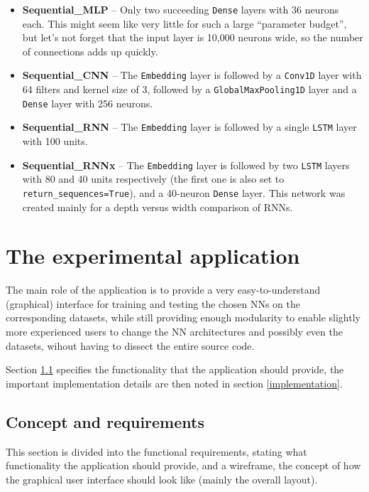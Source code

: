 \begin{itemize}
    \item \textbf{Sequential\_MLP} -- Only two succeeding \texttt{Dense} layers with 36 neurons each.
    This might seem like very little for such a large ``parameter budget'', but let's not forget that the
    input layer is 10,000 neurons wide, so the number of connections adds up quickly.
    \item \textbf{Sequential\_CNN} -- The \texttt{Embedding} layer is followed by a \texttt{Conv1D} layer
    with 64 filters and kernel size of 3, followed by a \texttt{GlobalMaxPooling1D} layer
    and a \texttt{Dense} layer with 256 neurons.
    \item \textbf{Sequential\_RNN} -- The \texttt{Embedding} layer is followed by a single \texttt{LSTM}
    layer with 100 units.
    \item \textbf{Sequential\_RNNx} -- The \texttt{Embedding} layer is followed by two \texttt{LSTM}
    layers with 80 and 40 units respectively (the first one is also set to \texttt{return\_sequences=True}),
    and a 40-neuron \texttt{Dense} layer. This network was created mainly for a depth versus width
    comparison of RNNs.
\end{itemize}








\chapter{The experimental application}
\label{the-experimental-application}
The main role of the application is to provide a very easy-to-understand (graphical) interface for training and
testing the chosen NNs on the corresponding datasets, while still providing enough modularity to enable slightly
more experienced users to change the NN architectures and possibly even the datasets, wihout having
to dissect the entire source code.

Section \ref{concept-and-requirements} specifies the functionality that the application should provide,
the important implementation details are then noted in section \ref{implementation}.




\section{Concept and requirements}
\label{concept-and-requirements}
This section is divided into the functional requirements, stating what functionality the application should provide,
and a wireframe, the concept of how the graphical user interface should look like (mainly the overall layout).


